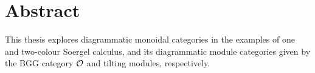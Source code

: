 \chapter*{Abstract}
\thispagestyle{empty}

This thesis explores diagrammatic monoidal categories in the examples of one and two-colour Soergel calculus, and its diagrammatic module categories given by the BGG category $\mathcal{O}$ and tilting modules, respectively.

